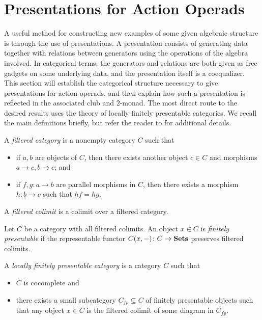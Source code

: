 \section{Presentations for Action Operads}

A useful method for constructing new examples of some given algebraic structure is through the use of presentations. A presentation consists of generating data together with relations between generators using the operations of the algebra involved. In categorical terms, the generators and relations are both given as free gadgets on some underlying data, and the presentation itself is a coequalizer. This section will establish the categorical structure necessary to give presentations for action operads, and then explain how such a presentation is reflected in the associated club and $2$-monad. The most direct route to the desired results uses the theory of locally finitely presentable categories. We recall the main definitions briefly, but refer the reader to \cite{ar} for additional details.

\begin{Defi}\label{def:filtered}
  A \textit{filtered category} is a nonempty category $C$ such that
    \begin{itemize}
      \item if $a,b$ are objects of $C$, then there exists another object $c \in C$ and morphisms $a \rightarrow c, b \rightarrow c$; and
      \item if $f,g \colon a \rightarrow b$ are parallel morphisms in $C$, then there exists a morphism $h \colon b \rightarrow c$ such that $hf = hg$.
    \end{itemize}
\end{Defi}

\begin{Defi}
  A \emph{filtered colimit} is a colimit over a filtered category.
\end{Defi}

\begin{Defi}
  Let $C$ be a category with all filtered colimits. An object $x \in C$ is \textit{finitely presentable} if the representable functor $C(x, -) \colon C \rightarrow \mathbf{Sets}$ preserves filtered colimits.
\end{Defi}

\begin{Defi}
  A \textit{locally finitely presentable category} is a category $C$ such that
  \begin{itemize}
    \item $C$ is cocomplete and
    \item there exists a small subcategory $C_{fp} \subseteq C$ of finitely presentable objects such that any object $x \in C$ is the filtered colimit of some diagram in $C_{fp}$.
  \end{itemize}
\end{Defi}

